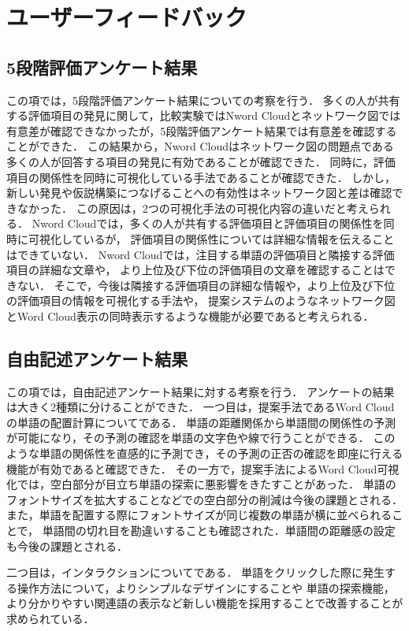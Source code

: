 \documentclass[syuuron]{kuee}
\begin{document}
	\section{ユーザーフィードバック}
		\subsection{5段階評価アンケート結果}
		この項では，5段階評価アンケート結果についての考察を行う．
		多くの人が共有する評価項目の発見に関して，比較実験ではNword Cloudとネットワーク図では
		有意差が確認できなかったが，5段階評価アンケート結果では有意差を確認することができた．
		この結果から，Nword Cloudはネットワーク図の問題点である多くの人が回答する項目の発見に有効であることが確認できた．
		同時に，評価項目の関係性を同時に可視化している手法であることが確認できた．
		しかし，新しい発見や仮説構築につなげることへの有効性はネットワーク図と差は確認できなかった．
		この原因は，2つの可視化手法の可視化内容の違いだと考えられる．
		Nword Cloudでは，多くの人が共有する評価項目と評価項目の関係性を同時に可視化しているが，
		評価項目の関係性については詳細な情報を伝えることはできていない．
		Nword Cloudでは，注目する単語の評価項目と隣接する評価項目の詳細な文章や，
		より上位及び下位の評価項目の文章を確認することはできない．
		そこで，今後は隣接する評価項目の詳細な情報や，より上位及び下位の評価項目の情報を可視化する手法や，
		提案システムのようなネットワーク図とWord Cloud表示の同時表示するような機能が必要であると考えられる．
		
		\subsection{自由記述アンケート結果}
		この項では，自由記述アンケート結果に対する考察を行う．
		アンケートの結果は大きく2種類に分けることができた．
		一つ目は，提案手法であるWord Cloudの単語の配置計算についてである．
		単語の距離関係から単語間の関係性の予測が可能になり，その予測の確認を単語の文字色や線で行うことができる．
		このような単語の関係性を直感的に予測でき，その予測の正否の確認を即座に行える機能が有効であると確認できた．
		その一方で，提案手法によるWord Cloud可視化では，空白部分が目立ち単語の探索に悪影響をきたすことがあった．
		単語のフォントサイズを拡大することなどでの空白部分の削減は今後の課題とされる．
		また，単語を配置する際にフォントサイズが同じ複数の単語が横に並べられることで，
		単語間の切れ目を勘違いすることも確認された．単語間の距離感の設定も今後の課題とされる．
	
		二つ目は，インタラクションについてである．
		単語をクリックした際に発生する操作方法について，よりシンプルなデザインにすることや
		単語の探索機能，より分かりやすい関連語の表示など新しい機能を採用することで改善することが求められている．
		
\end{document}
